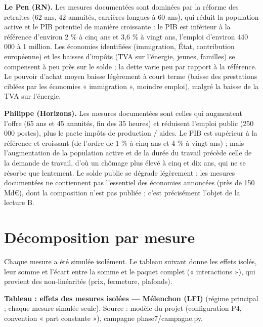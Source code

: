 \documentclass[
  11pt,
  11pt,
  a4paper,
  openany]{book}
\begin{document}
\textbf{Le Pen (RN).} Les mesures documentées sont dominées par la
réforme des retraites (62 ans, 42 annuités, carrières longues à 60 ans),
qui réduit la population active et le PIB potentiel de manière
croissante : le PIB est inférieur à la référence d'environ 2 \% à cinq
ans et 3,6 \% à vingt ans, l'emploi d'environ 440 000 à 1 million. Les
économies identifiées (immigration, État, contribution européenne) et
les baisses d'impôts (TVA sur l'énergie, jeunes, familles) se compensent
à peu près sur le solde ; la dette varie peu par rapport à la référence.
Le pouvoir d'achat moyen baisse légèrement à court terme (baisse des
prestations ciblées par les économies « immigration », moindre emploi),
malgré la baisse de la TVA sur l'énergie.

\textbf{Philippe (Horizons).} Les mesures documentées sont celles qui
augmentent l'offre (65 ans et 45 annuités, fin des 35 heures) et
réduisent l'emploi public (250 000 postes), plus le pacte impôts de
production / aides. Le PIB est supérieur à la référence et croissant (de
l'ordre de 1 \% à cinq ans et 4 \% à vingt ans) ; mais l'augmentation de
la population active et de la durée du travail précède celle de la
demande de travail, d'où un chômage plus élevé à cinq et dix ans, qui ne
se résorbe que lentement. Le solde public se dégrade légèrement : les
mesures documentées ne contiennent pas l'essentiel des économies
annoncées (près de 150 Md€), dont la composition n'est pas publiée ;
c'est précisément l'objet de la lecture B.

\hypertarget{sec:decomposition}{%
\section{Décomposition par mesure}\label{sec:decomposition}}

Chaque mesure a été simulée isolément. Le tableau suivant donne les
effets isolés, leur somme et l'écart entre la somme et le paquet complet
(« interactions »), qui provient des non-linéarités (prix, fermeture,
plafonds).

\textbf{Tableau : effets des mesures isolées --- Mélenchon (LFI)}
(régime principal ; chaque mesure simulée seule). Source : modèle du
projet (configuration P4, convention « part constante »), campagne
phase7/campagne.py.
\end{document}
